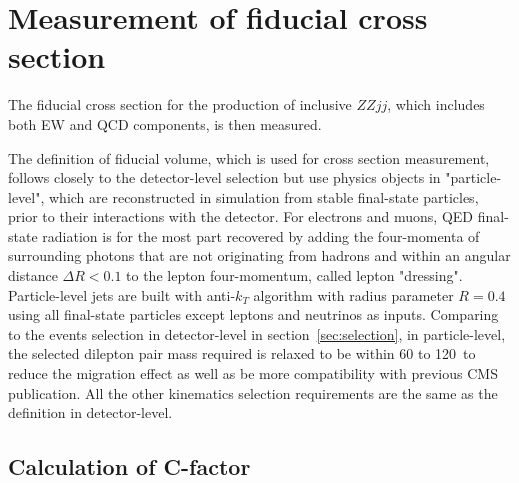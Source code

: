 \section{Measurement of fiducial cross section}
\label{sec:xsec}

The fiducial cross section for the production of inclusive $ZZjj$, which includes both EW and QCD components, is then measured.

The definition of fiducial volume, which is used for cross section measurement, follows closely to the detector-level selection
but use physics objects in "particle-level", which are reconstructed in simulation from stable final-state particles,
prior to their interactions with the detector.
For electrons and muons, QED final-state radiation is for the most part recovered 
by adding the four-momenta of surrounding photons that are not originating from hadrons and within an angular distance $\Delta R < 0.1$
to the lepton four-momentum, called lepton "dressing".
Particle-level jets are built with anti-$k_{T}$ algorithm with radius parameter $R = 0.4$ using all final-state particles except leptons and neutrinos as inputs.
Comparing to the events selection in detector-level in section~\ref{sec:selection},
in particle-level, the selected dilepton pair mass required is relaxed to be within 60 to 120~\gev to reduce the migration effect
as well as be more compatibility with previous CMS publication\cite{2017682}.
All the other kinematics selection requirements are the same as the definition in detector-level.

\subsection{Calculation of C-factor}
\label{sec:cf}

